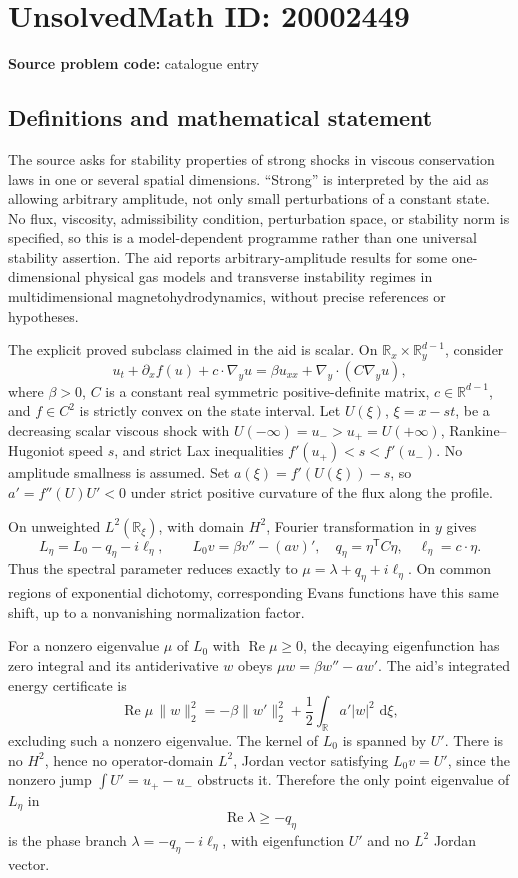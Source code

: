 \documentclass[11pt]{article}
\newcommand{\R}{\mathbb{R}}
\newcommand{\dd}{\,\mathrm{d}}
\begin{document}
\section*{UnsolvedMath ID: 20002449}
\textbf{Source problem code:} catalogue entry
\subsection{Definitions and mathematical statement}
The source asks for stability properties of strong shocks in viscous conservation laws in one or several spatial dimensions. ``Strong'' is interpreted by the aid as allowing arbitrary amplitude, not only small perturbations of a constant state. No flux, viscosity, admissibility condition, perturbation space, or stability norm is specified, so this is a model-dependent programme rather than one universal stability assertion. The aid reports arbitrary-amplitude results for some one-dimensional physical gas models and transverse instability regimes in multidimensional magnetohydrodynamics, without precise references or hypotheses.

The explicit proved subclass claimed in the aid is scalar. On \(\R_x\times\R^{d-1}_y\), consider
\[
 u_t+\partial_x f(u)+c\cdot\nabla_yu
 =\beta u_{xx}+\nabla_y\cdot(C\nabla_yu),
\]
where \(\beta>0\), \(C\) is a constant real symmetric positive-definite matrix, \(c\in\R^{d-1}\), and \(f\in C^2\) is strictly convex on the state interval. Let \(U(\xi)\), \(\xi=x-st\), be a decreasing scalar viscous shock with \(U(-\infty)=u_->u_+=U(+\infty)\), Rankine--Hugoniot speed \(s\), and strict Lax inequalities \(f'(u_+)<s<f'(u_-)\). No amplitude smallness is assumed. Set \(a(\xi)=f'(U(\xi))-s\), so \(a'=f''(U)U'<0\) under strict positive curvature of the flux along the profile.

On unweighted \(L^2(\R_\xi)\), with domain \(H^2\), Fourier transformation in \(y\) gives
\[
 L_\eta=L_0-q_\eta-i\ell_\eta,\qquad
 L_0v=\beta v''-(av)',\quad
 q_\eta=\eta^{\mathsf T}C\eta,\quad\ell_\eta=c\cdot\eta.
\]
Thus the spectral parameter reduces exactly to \(\mu=\lambda+q_\eta+i\ell_\eta\). On common regions of exponential dichotomy, corresponding Evans functions have this same shift, up to a nonvanishing normalization factor.

For a nonzero eigenvalue \(\mu\) of \(L_0\) with \(\operatorname{Re}\mu\ge0\), the decaying eigenfunction has zero integral and its antiderivative \(w\) obeys \(\mu w=\beta w''-aw'\). The aid's integrated energy certificate is
\[
 \operatorname{Re}\mu\,\|w\|_2^2
 =-\beta\|w'\|_2^2+\frac12\int_\R a'|w|^2\,\dd\xi,
\]
excluding such a nonzero eigenvalue. The kernel of \(L_0\) is spanned by \(U'\). There is no \(H^2\), hence no operator-domain \(L^2\), Jordan vector satisfying \(L_0v=U'\), since the nonzero jump \(\int U'=u_+-u_-\) obstructs it. Therefore the only point eigenvalue of \(L_\eta\) in
\[
 \operatorname{Re}\lambda\ge-q_\eta
\]
is the phase branch \(\lambda=-q_\eta-i\ell_\eta\), with eigenfunction \(U'\) and no \(L^2\) Jordan vector.
\end{document}
